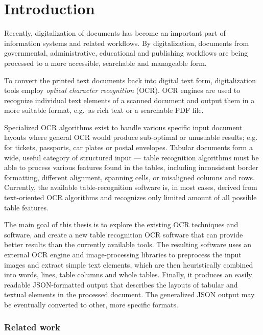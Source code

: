 \chapter*{Introduction}

Recently, digitalization of documents has become an important part of information systems and related workflows. By digitalization, documents from governmental, administrative, educational and publishing workflows are being processed to a more accessible, searchable and manageable form.

To convert the printed text documents back into digital text form, digitalization tools employ \emph{optical character recognition} (OCR). OCR engines are used to recognize individual text elements of a scanned document and output them in a more suitable format, e.g.~as rich text or a searchable PDF file.

Specialized OCR algorithms exist to handle various specific input document layouts where general OCR would produce sub-optimal or unusuable results; e.g. for tickets, passports, car plates or postal envelopes. Tabular documents form a wide, useful category of structured input --- table recognition algorithms must be able to process various features found in the tables, including inconsistent border formatting, different alignment, spanning cells, or misaligned columns and rows. Currently, the available table-recognition software is, in most cases, derived from text-oriented OCR algorithms and recognizes only limited amount of all possible table features.

The main goal of this thesis is to explore the existing OCR techniques and software, and create a new table recognition OCR software that can provide better results than the currently available tools. The resulting software uses an external OCR engine and image-processing libraries to preprocess the input images and extract simple text elements, which are then heuristically combined into words, lines, table columns and whole tables. Finally, it produces an easily readable JSON-formatted output that describes the layouts of tabular and textual elements in the processed document. The generalized JSON output may be eventually converted to other, more specific formats.

\subsection*{Related work}

